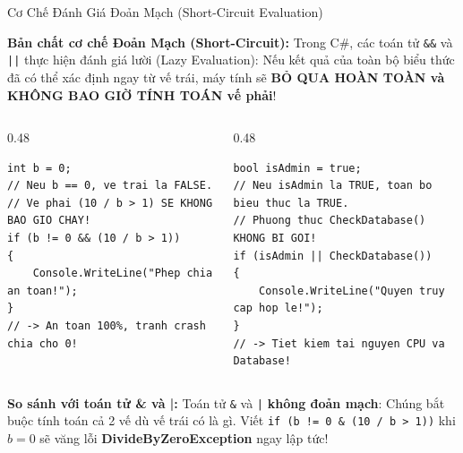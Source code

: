\documentclass[aspectratio=169, 10pt]{beamer}
\begin{document}
\begin{frame}[fragile]{Cơ Chế Đánh Giá Đoản Mạch (Short-Circuit Evaluation)}
  \begin{alertblock}{\textbf{Bản chất cơ chế Đoản Mạch (Short-Circuit):}}
    Trong C\#, các toán tử \texttt{\&\&} và \texttt{||} thực hiện đánh giá lười (Lazy Evaluation): Nếu kết quả của toàn bộ biểu thức đã có thể xác định ngay từ vế trái, máy tính sẽ \textbf{BỎ QUA HOÀN TOÀN và KHÔNG BAO GIỜ TÍNH TOÁN vế phải}!
  \end{alertblock}

  \begin{columns}[T]
    \begin{column}{0.48\textwidth}
      \begin{tcolorbox}[colback=UniGreen!10,colframe=UniGreen,title=\textbf{Đoản mạch VÀ (\&\&): Dừng khi gặp FALSE},fonttitle=\small\bfseries]
\begin{lstlisting}[numbers=none]
int b = 0;
// Neu b == 0, ve trai la FALSE.
// Ve phai (10 / b > 1) SE KHONG BAO GIO CHAY!
if (b != 0 && (10 / b > 1))
{
    Console.WriteLine("Phep chia an toan!");
}
// -> An toan 100%, tranh crash chia cho 0!
\end{lstlisting}
      \end{tcolorbox}
    \end{column}

    \begin{column}{0.48\textwidth}
      \begin{tcolorbox}[colback=UniGreen!10,colframe=UniGreen,title=\textbf{Đoản mạch HOẶC (||): Dừng khi gặp TRUE},fonttitle=\small\bfseries]
\begin{lstlisting}[numbers=none]
bool isAdmin = true;
// Neu isAdmin la TRUE, toan bo bieu thuc la TRUE.
// Phuong thuc CheckDatabase() KHONG BI GOI!
if (isAdmin || CheckDatabase())
{
    Console.WriteLine("Quyen truy cap hop le!");
}
// -> Tiet kiem tai nguyen CPU va Database!
\end{lstlisting}
      \end{tcolorbox}
    \end{column}
  \end{columns}

  \begin{block}{\textbf{So sánh với toán tử \& và |:}}
    Toán tử \texttt{\&} và \texttt{|} \textbf{không đoản mạch}: Chúng bắt buộc tính toán cả 2 vế dù vế trái có là gì. Viết \texttt{if (b != 0 \& (10 / b > 1))} khi $b=0$ sẽ văng lỗi \textbf{DivideByZeroException} ngay lập tức!
  \end{block}
\end{frame}
\end{document}
